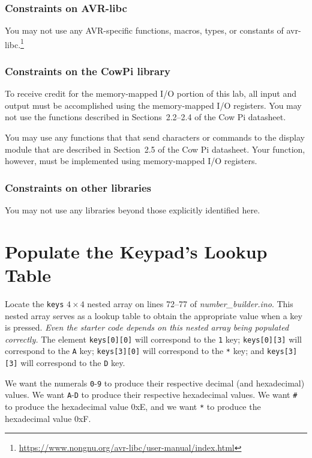 \subsubsection{Constraints on AVR-libc}

You may not use any AVR-specific functions, macros, types, or constants of avr-libc.\footnote{\url{https://www.nongnu.org/avr-libc/user-manual/index.html}}

\subsubsection{Constraints on the CowPi library}

To receive credit for the memory-mapped I/O portion of this lab, all input and
output must be accomplished using the memory-mapped I/O registers.
You may not use the functions described in Sections~2.2--2.4 of the Cow Pi datasheet.

You may use any functions that that send characters or commands to the display module that are described in Section~2.5 of the Cow Pi datasheet.
Your  function, however, must be implemented using memory-mapped I/O registers.

\subsubsection{Constraints on other libraries}

You may not use any libraries beyond those explicitly identified here.



\section{Populate the Keypad's Lookup Table} \label{sec:populateKeypad}

Locate the \lstinline{keys} $4 \times 4$ nested array on lines 72--77 of \textit{number\_builder.ino}.
This nested array serves as a lookup table to obtain the appropriate value when a key is pressed.
\textit{Even the starter code depends on this nested array being populated correctly.}
The element \lstinline{keys[0][0]} will correspond to the \texttt{1} key;
\lstinline{keys[0][3]} will correspond to the \texttt{A} key;
\lstinline{keys[3][0]} will correspond to the \texttt{*} key;
and \lstinline{keys[3][3]} will correspond to the \texttt{D} key.

We want the numerals \texttt{0}-\texttt{9} to produce their respective decimal
(and hexadecimal) values. We want \texttt{A}-\texttt{D} to produce their
respective hexadecimal values. We want \texttt{\#} to produce the hexadecimal
value 0xE, and we want \texttt{*} to produce the hexadecimal value 0xF.

